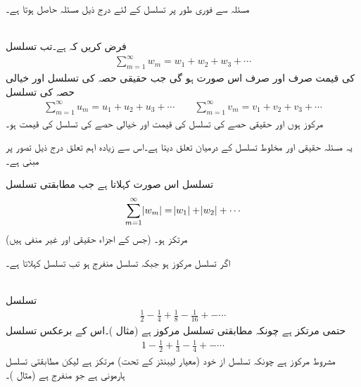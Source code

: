 مسئلہ  سے  فوری طور پر تسلسل کے لئے درج ذیل مسئلہ حاصل ہوتا ہے۔

\quad {}\\
فرض کریں کہ  ہے۔تب تسلسل
\begin{align*}
\sum_{m=1}^{\infty} w_m=w_1+w_2+w_3+\cdots
\end{align*}
کی قیمت صرف اور صرف اس صورت  ہو گی جب حقیقی حصہ کی تسلسل اور خیالی حصہ کی تسلسل 
\begin{align*}
\sum_{m=1}^{\infty} u_m=u_1+u_2+u_3+\cdots\quad \text{}\quad \sum_{m=1}^{\infty} v_m=v_1+v_2+v_3+\cdots
\end{align*}
مرکوز ہوں اور حقیقی حصے کی تسلسل کی قیمت  اور خیالی حصے کی تسلسل کی قیمت   ہو۔

یہ مسئلہ حقیقی اور مخلوط تسلسل کے درمیان تعلق دیتا ہے۔اس سے زیادہ اہم تعلق درج ذیل تصور پر مبنی ہے۔ 

تسلسل  اس صورت   کہلاتا ہے جب مطابقتی تسلسل
\begin{align}\label{مساوات_ترتیب_حتمی_مرتکز}
\sum_{m=1}^{\infty} \abs{w_m}=\abs{w_1}+\abs{w_2}+\cdots
\end{align}
(جس کے اجزاء حقیقی اور غیر منفی ہیں) مرتکز ہو۔

اگر تسلسل  مرکوز ہو جبکہ  تسلسل  منفرج ہو تب تسلسل    کہلاتا ہے۔

\quad {}\\
تسلسل
\begin{align*}
\frac{1}{2}-\frac{1}{4}+\frac{1}{8}-\frac{1}{16}+-\cdots
\end{align*}
حتمی مرتکز ہے چونکہ مطابقتی تسلسل  مرکوز ہے (مثال )۔اس کے برعکس تسلسل
\begin{align*}
1-\frac{1}{2}+\frac{1}{3}-\frac{1}{4}+-\cdots
\end{align*}
مشروط مرکوز ہے چونکہ تسلسل از خود (معیار لیبنٹز کے تحت) مرتکز ہے لیکن مطابقتی تسلسل  ہارمونی ہے جو منفرج ہے (مثال )۔

